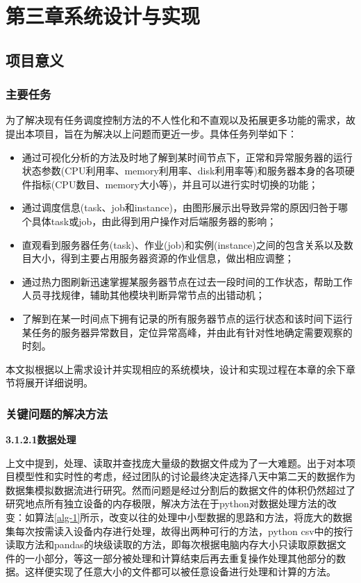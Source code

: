 \chapter{第三章\quad 系统设计与实现}
\section{项目意义}
\subsection{主要任务}

为了解决现有任务调度控制方法的不人性化和不直观以及拓展更多功能的需求，故提出本项目，旨在为解决以上问题而更近一步。具体任务列举如下：

\begin{itemize}
	\item 通过可视化分析的方法及时地了解到某时间节点下，正常和异常服务器的运行状态参数(CPU利用率、memory利用率、disk利用率等)和服务器本身的各项硬件指标(CPU数目、memory大小等)，并且可以进行实时切换的功能；
	\item 通过调度信息(task、job和instance)，由图形展示出导致异常的原因归咎于哪个具体task或job，由此得到用户操作对后端服务器的影响；
	\item 直观看到服务器任务(task)、作业(job)和实例(instance)之间的包含关系以及数目大小，得到主要占用服务器资源的作业信息，做出相应调整；
	\item 通过热力图刷新迅速掌握某服务器节点在过去一段时间的工作状态，帮助工作人员寻找规律，辅助其他模块判断异常节点的出错动机；
	\item 了解到在某一时间点下拥有记录的所有服务器节点的运行状态和该时间下运行某任务的服务器异常数目，定位异常高峰，并由此有针对性地确定需要观察的时刻。
\end{itemize}

本文拟根据以上需求设计并实现相应的系统模块，设计和实现过程在本章的余下章节将展开详细说明。

\subsection{关键问题的解决方法}

{\textbf{3.1.2.1\quad 数据处理}}

上文中提到，处理、读取并查找庞大量级的数据文件成为了一大难题。出于对本项目模型性和实时性的考虑，经过团队的讨论最终决定选择八天中第二天的数据作为数据集模拟数据流进行研究。然而问题是经过分割后的数据文件的体积仍然超过了研究地点所有独立设备的内存极限，解决方法在于python对数据处理方法的改变：如算法\ref{alg-1}所示，改变以往的处理中小型数据的思路和方法，将庞大的数据集每次按需读入设备内存进行处理，故得出两种可行的方法，python csv中的按行读取方法和pandas的块级读取的方法，即每次根据电脑内存大小只读取原数据文件的一小部分，等这一部分被处理和计算结束后再去重复操作处理其他部分的数据。这样便实现了任意大小的文件都可以被任意设备进行处理和计算的方法。

